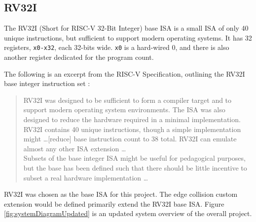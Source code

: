         

\subsection{RV32I}
    The RV32I (Short for RISC-V 32-Bit Integer) base \gls{ISA} is a small \gls{ISA} of only 40 unique instructions, but sufficient to support modern operating systems. It has 32 registers, \texttt{x0-x32}, each 32-bits wide. \texttt{x0} is a hard-wired 0, and there is also another register dedicated for the program count. 


    The following is an excerpt from the RISC-V Specification, outlining the RV32I base integer instruction set \cite{Waterman2019}:
    \begin{quote}{}
        \small{RV32I was designed to be sufficient to form a compiler target and to support modern operating system environments. The ISA was also designed to reduce the hardware required in a minimal implementation. RV32I contains 40 unique instructions, though a simple implementation might \dots [reduce] base instruction count to 38 total. RV32I can emulate almost any other ISA extension \dots \\
        Subsets of the base integer ISA might be useful for pedagogical purposes, but the base has been defined such that there should be little incentive to subset a real hardware implementation \dots}
    \end{quote}

    RV32I was chosen as the base ISA for this project. The edge collision custom extension would be defined primarily extend the RV32I base ISA. Figure \ref{fig:systemDiagramUpdated} is an updated system overview of the overall project.

    




